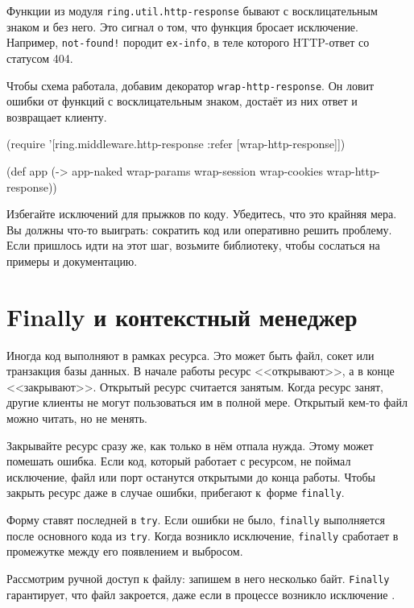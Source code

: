 Функции из модуля \texttt{ring.util.http\--res\-ponse} бывают с восклицательным
знаком и без него. Это сигнал о том, что функция бросает исключение. Например,
\verb|not-found!| породит \verb|ex-info|, в теле которого HTTP-ответ со
статусом 404.


Чтобы схема работала, добавим декоратор \verb|wrap-http-response|. Он ловит
ошибки от функций с восклицательным знаком, достаёт из них ответ и
возвращает клиенту.

\begin{english}
  \begin{clojure}
(require '[ring.middleware.http-response
           :refer [wrap-http-response]])

(def app
  (-> app-naked
      wrap-params
      wrap-session
      wrap-cookies
      wrap-http-response))
  \end{clojure}
\end{english}

Избегайте исключений для прыжков по коду. Убедитесь, что это крайняя мера. Вы
должны что-то выиграть: сократить код или оперативно решить проблему. Если
пришлось идти на этот шаг, возьмите библиотеку, чтобы сослаться на примеры и
документацию.


\section{Finally и контекстный менеджер}

Иногда код выполняют в рамках ресурса. Это может быть файл, сокет или транзакция
базы данных. В начале работы ресурс <<открывают>>, а в конце
<<закрывают>>. Открытый ресурс считается занятым. Когда ресурс занят, другие
клиенты не могут пользоваться им в полной мере. Открытый кем-то файл можно
читать, но не менять.

Закрывайте ресурс сразу же, как только в нём отпала нужда. Этому может
помешать ошибка. Если код, который работает с ресурсом, не поймал исключение,
файл или порт останутся открытыми до конца работы. Чтобы закрыть ресурс даже в
случае ошибки, прибегают к~форме \verb|finally|.

Форму ставят последней в \verb|try|. Если ошибки не было, \verb|finally|
выполняется после основного кода из \verb|try|. Когда возникло исключение,
\verb|finally| сработает в промежутке между его появлением и выбросом.

Рассмотрим ручной доступ к файлу: запишем в него несколько
байт. \verb|Finally| гарантирует, что файл закроется, даже если в процессе
возникло исключение .

